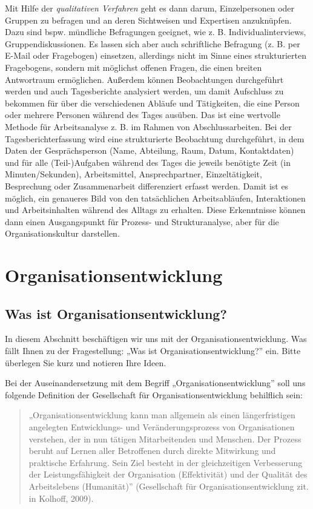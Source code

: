 \documentclass[
  letterpaper,
]{book}
\begin{document}
Mit Hilfe der \emph{qualitativen Verfahren} geht es dann darum,
Einzelpersonen oder Gruppen zu befragen und an deren Sichtweisen und
Expertisen anzuknüpfen. Dazu sind bspw. mündliche Befragungen geeignet,
wie z. B. Individualinterviews, Gruppendiskussionen. Es lassen sich aber
auch schriftliche Befragung (z. B. per E-Mail oder Fragebogen)
einsetzen, allerdings nicht im Sinne eines strukturierten Fragebogens,
sondern mit möglichst offenen Fragen, die einen breiten Antwortraum
ermöglichen. Außerdem können Beobachtungen durchgeführt werden und auch
Tagesberichte analysiert werden, um damit Aufschluss zu bekommen für
über die verschiedenen Abläufe und Tätigkeiten, die eine Person oder
mehrere Personen während des Tages ausüben. Das ist eine wertvolle
Methode für Arbeitsanalyse z. B. im Rahmen von Abschlussarbeiten. Bei
der Tagesberichterfassung wird eine strukturierte Beobachtung
durchgeführt, in dem Daten der Gesprächsperson (Name, Abteilung, Raum,
Datum, Kontaktdaten) und für alle (Teil-)Aufgaben während des Tages die
jeweils benötigte Zeit (in Minuten/Sekunden), Arbeitsmittel,
Ansprechpartner, Einzeltätigkeit, Besprechung oder Zusammenarbeit
differenziert erfasst werden. Damit ist es möglich, ein genaueres Bild
von den tatsächlichen Arbeitsabläufen, Interaktionen und Arbeitsinhalten
während des Alltags zu erhalten. Diese Erkenntnisse können dann einen
Ausgangspunkt für Prozess- und Strukturanalyse, aber für die
Organisationskultur darstellen.

\section{Organisationsentwicklung}\label{organisationsentwicklung}

\subsection{Was ist
Organisationsentwicklung?}\label{was-ist-organisationsentwicklung}

In diesem Abschnitt beschäftigen wir uns mit der
Organisationsentwicklung. Was fällt Ihnen zu der Fragestellung: „Was ist
Organisationsentwicklung?'' ein. Bitte überlegen Sie kurz und notieren
Ihre Ideen.

Bei der Auseinandersetzung mit dem Begriff „Organisationsentwicklung''
soll uns folgende Definition der Gesellschaft für
Organisationsentwicklung behilflich sein:

\begin{quote}
„Organisationsentwicklung kann man allgemein als einen längerfristigen
angelegten Entwicklungs- und Veränderungsprozess von Organisationen
verstehen, der in nun tätigen Mitarbeitenden und Menschen. Der Prozess
beruht auf Lernen aller Betroffenen durch direkte Mitwirkung und
praktische Erfahrung. Sein Ziel besteht in der gleichzeitigen
Verbesserung der Leistungsfähigkeit der Organisation (Effektivität) und
der Qualität des Arbeitslebens (Humanität)'' (Gesellschaft für
Organisationsentwicklung zit. in Kolhoff, 2009).
\end{quote}
\end{document}
